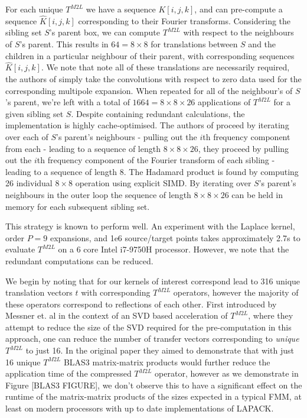 For each unique $T^{M2L}$ we have a sequence $K[i, j, k]$, and can pre-compute a sequence $\hat{K}[i, j, k]$ corresponding to their Fourier transforms. Considering the sibling set $S$'s parent box, we can compute $T^{M2L}$ with respect to the neighbours of $S$'s parent. This results in $64 = 8 \times 8$ for translations between $S$ and the children in a particular neighbour of their parent, with corresponding sequences $\hat{K}[i, j, k]$. We note that note all of these translations are necessarily required, the authors of \cite{malhotra2015pvfmm,wang2021exafmm} simply take the convolutions with respect to zero data used for the corresponding multipole expansion. When repeated for all of the neighbour's of $S$'s parent, we're left with a total of $1664 = 8 \times 8 \times 26$ applications of $T^{M2L}$ for a given sibling set $S$. Despite containing redundant calculations, the implementation is highly cache-optimised. The authors of \cite{malhotra2015pvfmm} proceed by iterating over each of $S$'s parent's neighbours - pulling out the $i$th frequency component from each - leading to a sequence of length $8 \times 8 \times 26$, they proceed by pulling out the $i$th frequency component of the Fourier transform of each sibling - leading to a sequence of length 8. The Hadamard product is found by computing 26 individual $8 \times 8$ operation using explicit SIMD. By iterating over $S$'s parent's neighbours in the outer loop the sequence of length $8 \times 8 \times 26$ can be held in memory for each subsequent sibling set.

This strategy is known to perform well. An experiment with the Laplace kernel, order $P=9$ expansions, and 1e6 source/target points takes approximately 2.7s to evaluate $T^{M2L}$ on a 6 core Intel i7-9750H processor. However, we note that the redundant computations can be reduced.

We begin by noting that for our kernels of interest correspond lead to 316 unique translation vectors $t$ with corresponding $T^{M2L}$ operators, however the majority of these operators correspond to reflections of each other. First introduced by Messner et. al \cite{messner2012optimized} in the context of an SVD based acceleration of $T^{M2L}$, where they attempt to reduce the size of the SVD required for the pre-computation in this approach, one can reduce the number of transfer vectors corresponding to \textit{unique} $T^{M2L}$ to just 16. In the original paper they aimed to demonstrate that with just 16 unique $T^{M2L}$ BLAS3 matrix-matrix products would further reduce the application time of the compressed $T^{M2L}$ operator, however as we demonstrate in Figure [BLAS3 FIGURE], we don't observe this to have a significant effect on the runtime of the matrix-matrix products of the sizes expected in a typical FMM, at least on modern processors with up to date implementations of LAPACK.

